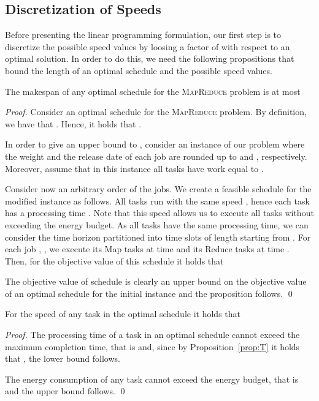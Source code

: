 \documentclass{llncs}
\newcommand{\mr}{\textsc{MapReduce}\xspace}
\begin{document}
\subsection{Discretization of Speeds}

Before presenting the linear programming formulation,
our first step is to discretize the possible speed values by loosing a factor of  with respect to an optimal solution.
In order to do this, we need the following propositions that bound the length of an optimal schedule and the possible speed values.

\begin{proposition}\label{prop:T}
The makespan of any optimal schedule for the \mr problem is at most

\end{proposition}
\begin{proof}
Consider an optimal schedule for the \mr problem.
By definition, we have that .
Hence, it holds that .

In order to give an upper bound to ,
consider an instance of our problem where the weight  and the release date 
of each job  are rounded up to  and , respectively.
Moreover, assume that in this instance all tasks have work equal to .

Consider now an arbitrary order  of the jobs.
We create a feasible schedule  for the modified instance as follows.
All tasks run with the same speed ,
hence each task has a processing time .
Note that this speed allows us to execute all tasks without exceeding the energy budget.
As all tasks have the same processing time, we can consider the time horizon partitioned into time slots of length  starting from .
For each job , , we execute its Map tasks at time 
and its Reduce tasks at time .
Then, for the objective value  of this schedule it holds that

The objective value of schedule  is clearly an upper bound on the objective value
 of an optimal schedule for the initial instance and the proposition follows.
\qed
\end{proof}

\begin{proposition}\label{prop:speedbound}
For the speed  of any task  in the optimal schedule it holds that

\end{proposition}
\begin{proof}
The processing time  of a task  in an  optimal schedule cannot exceed the maximum
completion time, that is   and,  since by Proposition~\ref{prop:T} it holds that
,  the lower bound follows.

The energy consumption of any task cannot exceed the energy
budget, that is  and
the upper bound follows.
\qed
\end{proof}
\end{document}
